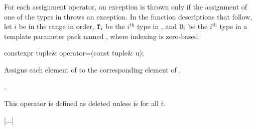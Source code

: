 \documentclass{wg21}
\begin{document}
\pnum
For each  assignment operator, an exception is thrown only if the
assignment of one of the types in  throws an exception.
In the function descriptions that follow, let $i$ be in the range 
in order, $\texttt{T}_i$ be the $i^\text{th}$ type in ,
and $\texttt{U}_i$ be the $i^\text{th}$ type in a
template parameter pack named , where indexing is zero-based.


%
\begin{itemdecl}
    constexpr tuple& operator=(const tuple& u);
\end{itemdecl}

\begin{itemdescr}
    \pnum
    \effects
    Assigns each element of  to the corresponding
    element of .

    \pnum
    \returns
    .

    \pnum
    \remarks
    This operator is defined as deleted unless
     is  for all $i$.
\end{itemdescr}

[...]

%
%
%
%
%
%
%
%
%
\end{document}
